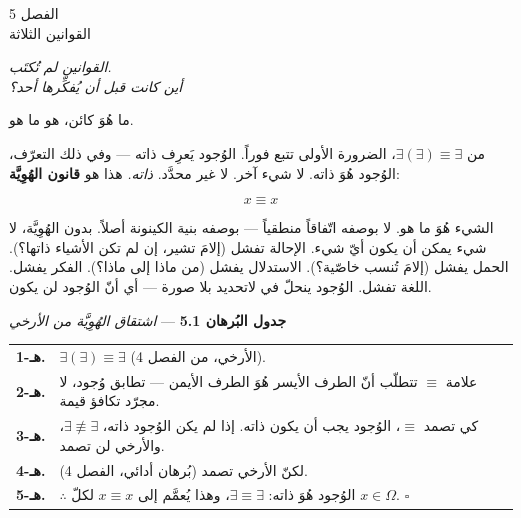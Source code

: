 \documentclass[10pt, openany, oneside]{book}
\renewcommand{\footnotesize}{\fontsize{8.5}{11}\selectfont}
\renewcommand{\large}{\fontsize{11.5}{14}\selectfont}
\renewcommand{\huge}{\fontsize{17}{21}\selectfont}
\begin{document}
\newpage

\begin{center}
    {\huge الفصل 5}\\[0.3em]
    {\large القوانين الثلاثة}
\end{center}

\vspace{1.5em}

\begin{center}
    \itshape
    القوانين لم تُكتَب.\\
    أين كانت قبل أن يُفكِّرها أحد؟
\end{center}

\vspace{2em}


\noindent ما هُوَ كائن، هو ما هو.

من $\exists(\exists) \equiv \exists$، الضرورة الأولى تتبع فوراً. الوُجود يَعرِف ذاته --- وفي ذلك التعرّف، الوُجود هُوَ ذاته. لا شيء آخر. لا غير محدَّد. \textit{ذاته.} هذا هو \textbf{قانون الهُوِيَّة}:

$$x \equiv x$$

الشيء هُوَ ما هو. لا بوصفه اتّفاقاً منطقياً --- بوصفه بنية الكينونة أصلاً. بدون الهُوِيَّة، لا شيء يمكن أن يكون أيّ شيء. الإحالة تفشل (إلامَ تشير، إن لم تكن الأشياء ذاتها؟). الحمل يفشل (إلامَ تُنسب خاصّية؟). الاستدلال يفشل (من ماذا إلى ماذا؟). الفكر يفشل. اللغة تفشل. الوُجود ينحلّ في لاتحديد بلا صورة --- أي أنّ الوُجود لن يكون.

\vspace{0.5em}

\textbf{جدول البُرهان 5.1} --- \textit{اشتقاق الهُوِيَّة من الأرخي}

\vspace{0.5em}

{\footnotesize
\noindent\begin{tabular}{r p{}}
\textbf{هـ-1.} & $\exists(\exists) \equiv \exists$ (الأرخي، من الفصل 4). \\[0.3em]
\textbf{هـ-2.} & علامة $\equiv$ تتطلّب أنّ الطرف الأيسر هُوَ الطرف الأيمن --- تطابق وُجود، لا مجرّد تكافؤ قيمة. \\[0.3em]
\textbf{هـ-3.} & كي تصمد $\equiv$، الوُجود يجب أن يكون ذاته. إذا لم يكن الوُجود ذاته، $\exists \not\equiv \exists$، والأرخي لن تصمد. \\[0.3em]
\textbf{هـ-4.} & لكنّ الأرخي تصمد (بُرهان أدائي، الفصل 4). \\[0.3em]
\textbf{هـ-5.} & $\therefore$ الوُجود هُوَ ذاته: $\exists \equiv \exists$، وهذا يُعمَّم إلى $x \equiv x$ لكلّ $x \in \Omega$. $\square$ \\[0.3em]
\end{tabular}
}
\end{document}
